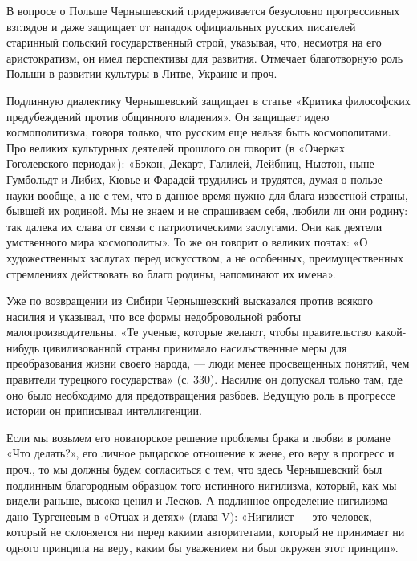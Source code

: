 В   вопросе   о    Польше   Чернышевский   придерживается   безусловно
прогрессивных взглядов и даже  защищает от нападок официальных русских
писателей  старинный польский  государственный  строй, указывая,  что,
несмотря  на  его аристократизм,  он  имел  перспективы для  развития.
Отмечает благотворную роль Польши в развитии культуры в Литве, Украине
и проч.

Подлинную   диалектику  Чернышевский   защищает   в  статье   «Критика
философских  предубеждений  против  общинного владения».  Он  защищает
идею  космополитизма,  говоря  только,  что русским  еще  нельзя  быть
космополитами. Про великих культурных  деятелей прошлого он говорит (в
«Очерках  Гоголевского периода»):  «Бэкон,  Декарт, Галилей,  Лейбниц,
Ньютон, ныне Гумбольдт и Либих,  Кювье и Фарадей трудились и трудятся,
думая о  пользе науки  вообще, а не  с тем, что  в данное  время нужно
для  блага известной  страны,  бывшей их  родиной. Мы  не  знаем и  не
спрашиваем  себя,  любили  ли  они  родину: так  далека  их  слава  от
связи с  патриотическими заслугами.  Они как деятели  умственного мира
космополиты». То  же он  говорит о  великих поэтах:  «О художественных
заслугах   перед   искусством,   а  не   особенных,   преимущественных
стремлениях действовать во благо родины, напоминают их имена».

Уже   по  возвращении   из  Сибири   Чернышевский  высказался   против
всякого  насилия  и  указывал,  что все  формы  недобровольной  работы
малопроизводительны. «Те  ученые, которые желают,  чтобы правительство
какой-нибудь цивилизованной  страны принимало насильственные  меры для
преобразования  жизни  своего  народа,  ---  люди  менее  просвещенных
понятий,  чем правители  турецкого государства»  (с. 330).  Насилие он
допускал  только  там,  где  оно было  необходимо  для  предотвращения
разбоев. Ведущую роль в прогрессе истории он приписывал интеллигенции.

Если  мы возьмем  его новаторское  решение  проблемы брака  и любви  в
романе «Что делать?», его личное  рыцарское отношение к жене, его веру
в  прогресс  и проч.,  то  мы  должны  будем  согласиться с  тем,  что
здесь Чернышевский  был подлинным благородным образцом  того истинного
нигилизма, который,  как мы  видели раньше, высоко  ценил и  Лесков. А
подлинное  определение нигилизма  дано  Тургеневым в  «Отцах и  детях»
(глава V): «Нигилист  --- это человек, который не  склоняется ни перед
какими авторитетами, который не принимает  ни одного принципа на веру,
каким бы уважением ни был окружен этот принцип».

